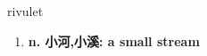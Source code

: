 
\begin{frame}
{\huge rivulet}
\begin{center}
\begin{enumerate}\Large
  \item \textbf{n. 小河,小溪: a small stream}
\end{enumerate}
\end{center}
\end{frame}
